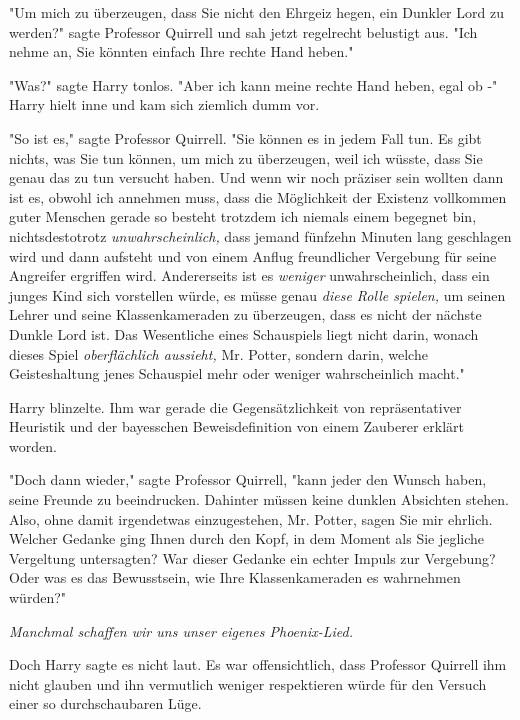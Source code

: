 {"Um mich zu überzeugen, dass Sie nicht den Ehrgeiz hegen, ein Dunkler Lord zu werden?" sagte Professor Quirrell und sah jetzt regelrecht belustigt aus. "Ich nehme an, Sie könnten einfach Ihre rechte Hand heben."

"Was?" sagte Harry tonlos. "Aber ich kann meine rechte Hand heben, egal ob -" Harry hielt inne und kam sich ziemlich dumm vor.

"So ist es," sagte Professor Quirrell. "Sie können es in jedem Fall tun. Es gibt nichts, was Sie tun können, um mich zu überzeugen, weil ich wüsste, dass Sie genau das zu tun versucht haben. Und wenn wir noch präziser sein wollten dann ist es, obwohl ich annehmen muss, dass die Möglichkeit der Existenz vollkommen guter Menschen gerade so besteht trotzdem ich niemals einem begegnet bin, nichtsdestotrotz \emph{unwahrscheinlich,} dass jemand fünfzehn Minuten lang geschlagen wird und dann aufsteht und von einem Anflug freundlicher Vergebung für seine Angreifer ergriffen wird. Andererseits ist es \emph{weniger} unwahrscheinlich, dass ein junges Kind sich vorstellen würde, es müsse genau \emph{diese Rolle spielen,} um seinen Lehrer und seine Klassenkameraden zu überzeugen, dass es nicht der nächste Dunkle Lord ist. Das Wesentliche eines Schauspiels liegt nicht darin, wonach dieses Spiel \emph{oberflächlich aussieht,} Mr. Potter, sondern darin, welche Geisteshaltung jenes Schauspiel mehr oder weniger wahrscheinlich macht."

Harry blinzelte. Ihm war gerade die Gegensätzlichkeit von repräsentativer Heuristik und der bayesschen Beweisdefinition von einem Zauberer erklärt worden.

"Doch dann wieder," sagte Professor Quirrell, "kann jeder den Wunsch haben, seine Freunde zu beeindrucken. Dahinter müssen keine dunklen Absichten stehen. Also, ohne damit irgendetwas einzugestehen, Mr. Potter, sagen Sie mir ehrlich. Welcher Gedanke ging Ihnen durch den Kopf, in dem Moment als Sie jegliche Vergeltung untersagten? War dieser Gedanke ein echter Impuls zur Vergebung? Oder was es das Bewusstsein, wie Ihre Klassenkameraden es wahrnehmen würden?"

\emph{Manchmal schaffen wir uns unser eigenes Phoenix-Lied.}

Doch Harry sagte es nicht laut. Es war offensichtlich, dass Professor Quirrell ihm nicht glauben und ihn vermutlich weniger respektieren würde für den Versuch einer so durchschaubaren Lüge.

}

